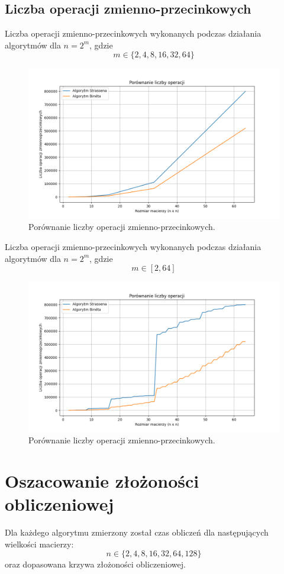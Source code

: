 \documentclass[11pt, leqno]{scrartcl}
\begin{document}
    \subsection{Liczba operacji zmienno-przecinkowych}
    Liczba operacji zmienno-przecinkowych wykonanych podczas
    działania algorytmów dla $n=2^m$, gdzie
    \[
        m \in \{2,4,8,16,32,64\}
    \]
    \begin{figure}[H]
        \centering
        \includegraphics[width=0.9\linewidth]{liczba_operacji1.png}
        \caption{Porównanie liczby operacji zmienno-przecinkowych.}
    \end{figure}
    Liczba operacji zmienno-przecinkowych wykonanych podczas
    działania algorytmów dla $n=2^m$, gdzie
    \[
        m \in [2, 64]
    \]
    \begin{figure}[H]
        \centering
        \includegraphics[width=0.9\linewidth]{liczba_operacji2.png}
        \caption{Porównanie liczby operacji zmienno-przecinkowych.}
    \end{figure}

    \section{Oszacowanie złożoności obliczeniowej}
    Dla każdego algorytmu zmierzony został czas obliczeń dla
    następujących wielkości macierzy:
    \[
        n \in \{2,4,8,16,32,64,128\}
    \]
    oraz dopasowana krzywa złożoności obliczeniowej.
    
\end{document}
